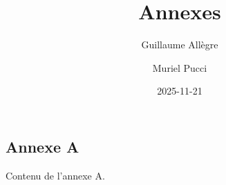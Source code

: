 \documentclass[
  french,
  letterpaper,
  DIV=11,
  numbers=noendperiod]{scrartcl}
\title{Annexes}
\author{Guillaume Allègre \and Muriel Pucci}
\date{2025-11-21}
\begin{document}
\maketitle


\subsection{Annexe A}\label{annexe-a}

Contenu de l'annexe A.
\end{document}
